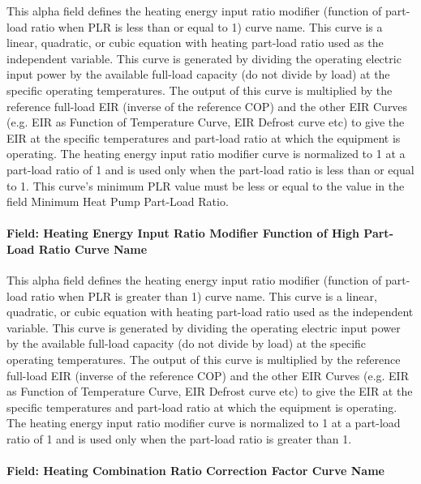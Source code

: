 This alpha field defines the heating energy input ratio modifier (function of part-load ratio when PLR is less than or equal to 1) curve name. This curve is a linear, quadratic, or cubic equation with heating part-load ratio used as the independent variable. This curve is generated by dividing the operating electric input power by the available full-load capacity (do not divide by load) at the specific operating temperatures. The output of this curve is multiplied by the reference full-load EIR (inverse of the reference COP) and the other EIR Curves (e.g. EIR as 
Function of Temperature Curve, EIR Defrost curve etc) to give the EIR at the specific temperatures and part-load ratio at which the equipment is operating. The heating energy input ratio modifier curve is normalized to 1 at a part-load ratio of 1 and is used only when the part-load ratio is less than or equal to 1. This curve's minimum PLR value must be less or equal to the value in the field Minimum Heat Pump Part-Load Ratio.

\paragraph{Field: Heating Energy Input Ratio Modifier Function of High Part-Load Ratio Curve Name}\label{field-heating-energy-input-ratio-modifier-function-of-high-part-load-ratio-curve-name}

This alpha field defines the heating energy input ratio modifier (function of part-load ratio when PLR is greater than 1) curve name. This curve is a linear, quadratic, or cubic equation with heating part-load ratio used as the independent variable. This curve is generated by dividing the operating electric input power by the available full-load capacity (do not divide by load) at the specific operating temperatures. The output of this curve is multiplied by the reference full-load EIR (inverse of the reference COP) and the other EIR Curves (e.g. EIR as Function of Temperature Curve, EIR Defrost curve etc) to give the EIR at the specific temperatures and part-load ratio at which the equipment is operating. The heating energy input ratio modifier curve is normalized to 1 at a part-load ratio of 1 and is used only when the part-load ratio is greater than 1.

\paragraph{Field: Heating Combination Ratio Correction Factor Curve Name}\label{field-heating-combination-ratio-correction-factor-curve-name}

